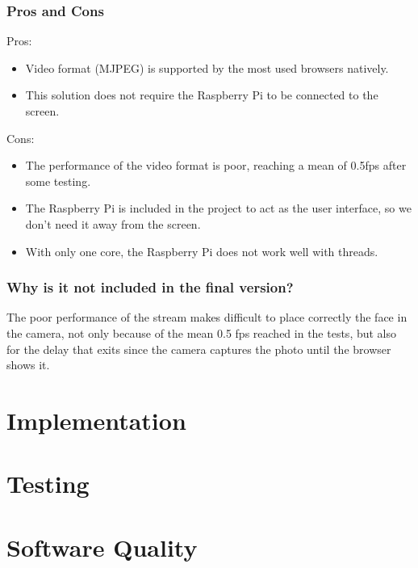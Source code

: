		\subsubsection{Pros and Cons}
		Pros:
		\begin{itemize}
			\item Video format (MJPEG) is supported by the most used browsers natively.
			\item This solution does not require the Raspberry Pi to be connected to the screen. 
		\end{itemize}

		Cons:
		\begin{itemize}
			\item The performance of the video format is poor, reaching a mean of 0.5fps after some testing.
			\item The Raspberry Pi is included in the project to act as the user interface, so we don't need it away from the screen.
			\item With only one core, the Raspberry Pi does not work well with threads.
		\end{itemize}
		
		\subsubsection{Why is it not included in the final version?}
		The poor performance of the stream makes difficult to place correctly the face in the camera, not only because of the mean 0.5 fps reached in the tests, but also for the delay that exits since the camera captures the photo until the browser shows it. 

\section{Implementation}
\section{Testing}
\section{Software Quality}